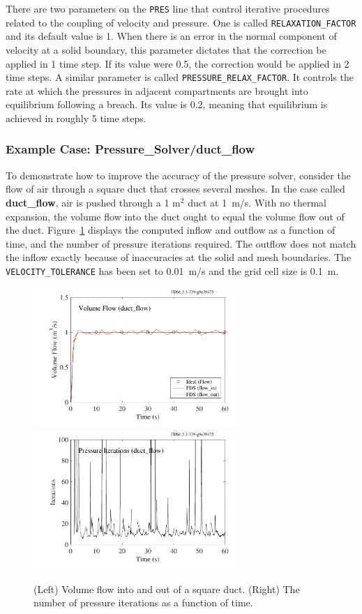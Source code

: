 \documentclass[11pt]{book}
\newcommand{\ct}{\tt\small}
\begin{document}
There are two parameters on the {\ct PRES} line that control iterative procedures related to the coupling of velocity and pressure. One is
called {\ct RELAXATION\_FACTOR} and its default value is 1. When there is an error in the normal component of velocity at a solid boundary, this
parameter dictates that the correction be applied in 1 time step. If its value were 0.5, the correction would be applied in 2 time steps. A similar
parameter is called {\ct PRESSURE\_RELAX\_FACTOR}. It controls the rate at which the pressures in adjacent compartments are brought into equilibrium following a
breach. Its value is 0.2, meaning that equilibrium is achieved in roughly 5 time steps.

\subsubsection{Example Case: Pressure\_Solver/duct\_flow}

To demonstrate how to improve the accuracy of the pressure solver, consider the flow of air through a square duct that crosses several meshes. In the
case called {\bf duct\_flow}, air is pushed through a 1 m$^2$ duct at 1~m/s. With no thermal expansion, the volume flow into the duct ought to equal the volume flow out of the
duct. Figure~\ref{duct_flow} displays the computed inflow and outflow as a function of time, and the number of pressure iterations required. The outflow does not match
the inflow exactly because of inaccuracies at the solid and mesh boundaries. The {\ct VELOCITY\_TOLERANCE} has been set to 0.01~m/s and the grid cell size is 0.1~m.

\begin{figure}[ht]
\begin{center}
\includegraphics[width=3in]{SCRIPT_FIGURES/duct_flow}
\includegraphics[width=3in]{SCRIPT_FIGURES/duct_flow_iterations}
\end{center}
\caption[Simple example of flow through a duct.]{(Left) Volume flow into and out of a square duct. (Right) The number of pressure iterations as a function of time.}
\label{duct_flow}
\end{figure}
\end{document}
